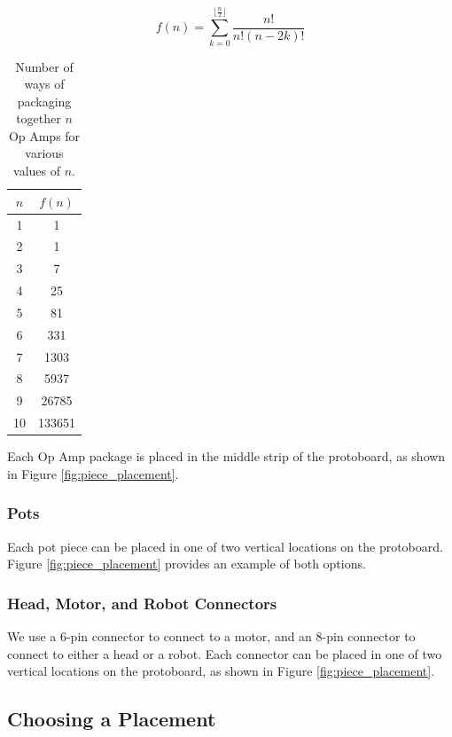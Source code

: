 \begin{equation}
f(n) = \sum\limits_{k=0}^{\lfloor\frac{n}{2}\rfloor}{\frac{n!}{n!(n - 2k)!}}
\label{eq:opamp}
\end{equation}

\begin{table}
\begin{center}
\begin{singlespace}
\begin{tabular}{c | c}
$n$ & $f(n)$ \\
\hline
\hline
1 & 1 \\
2 & 1 \\
3 & 7 \\
4 & 25 \\
5 & 81 \\
6 & 331 \\
7 & 1303 \\
8 & 5937 \\
9 & 26785 \\
10 & 133651
\end{tabular}
\end{singlespace}
\end{center}
\label{tb:opamp}
\caption{Number of ways of packaging together $n$ Op Amps for various values of
$n$.}
\end{table}

Each Op Amp package is placed in the middle strip of the protoboard, as shown in
Figure \ref{fig:piece_placement}.

\subsubsection{Pots}

Each pot piece can be placed in one of two vertical locations on the protoboard.
Figure \ref{fig:piece_placement} provides an example of both options.

\subsubsection{Head, Motor, and Robot Connectors}

We use a 6-pin connector to connect to a motor, and an 8-pin connector to
connect to either a head or a robot. Each connector can be placed in one of two
vertical locations on the protoboard, as shown in Figure
\ref{fig:piece_placement}.

\subsection{Choosing a Placement}

